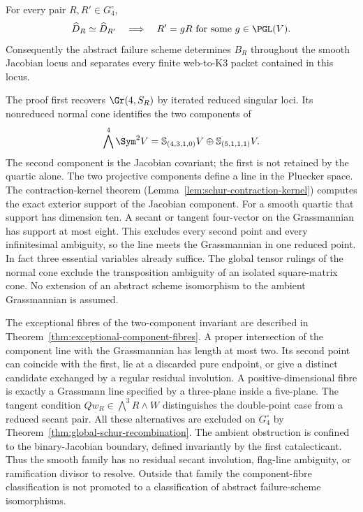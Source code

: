 \begin{theorem}
\label{thm:main-web-reconstruction}
For every pair \(R,R'\in G_4^\circ\),
\[
 \widehat D_R\simeq\widehat D_{R'}\quad\Longrightarrow\quad
 R'=gR\ \text{for some }g\in\PGL(V).
\]
Consequently the abstract failure scheme determines \(B_R\)
throughout the smooth Jacobian locus and separates every finite
web-to-K3 packet contained in this locus.
\end{theorem}

The proof first recovers \(\Gr(4,S_R)\) by iterated reduced
singular loci.  Its nonreduced normal cone identifies the two
components of
\[
 \bigwedge^4\Sym^2V=
 \mathbb S_{(4,3,1,0)}V\oplus\mathbb S_{(5,1,1,1)}V.
\]
The second component is the Jacobian covariant; the first is not
retained by the quartic alone.  The two projective components define a
line in the Pluecker space.  The contraction-kernel theorem
(Lemma~\ref{lem:schur-contraction-kernel}) computes the exact exterior
support of the Jacobian component.  For a smooth quartic that support
has dimension ten.  A secant or tangent four-vector on the Grassmannian
has support at most eight.  This excludes every second point and every
infinitesimal ambiguity, so the line meets the Grassmannian in one
reduced point.  In fact three essential variables already suffice.  The global tensor rulings of the normal cone
exclude the transposition ambiguity of an isolated square-matrix
cone.  No extension of an abstract scheme isomorphism to the ambient
Grassmannian is assumed.


The exceptional fibres of the two-component invariant are described in
Theorem~\ref{thm:exceptional-component-fibres}.  A proper intersection
of the component line with the Grassmannian has length at most two.
Its second point can coincide with the first, lie at a discarded pure
endpoint, or give a distinct candidate exchanged by a regular residual
involution.  A positive-dimensional fibre is exactly a Grassmann line
specified by a three-plane inside a five-plane.  The tangent condition
\(Qw_R\in\bigwedge^3R\wedge W\) distinguishes the double-point
case from a reduced secant pair.  All these alternatives are excluded on \(G_4^\circ\) by
Theorem~\ref{thm:global-schur-recombination}.  The ambient obstruction
is confined to the binary-Jacobian boundary, defined invariantly by the
first catalecticant.  Thus the smooth family has no residual secant
involution, flag-line ambiguity, or ramification divisor to resolve.
Outside that family the component-fibre classification is not promoted
to a classification of abstract failure-scheme isomorphisms.


